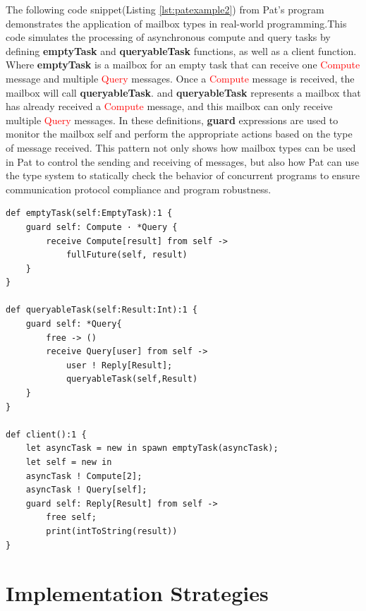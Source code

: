 \documentclass{l4proj}
\begin{document}
The following code snippet(Listing \ref{lst:patexample2}) from Pat's program demonstrates the application of mailbox types in real-world programming.This code simulates the processing of asynchronous compute and query tasks by defining \textbf{emptyTask} and \textbf{queryableTask} functions, as well as a client function. Where \textbf{emptyTask} is a mailbox for an empty task that can receive one \textcolor{red}{Compute} message and multiple \textcolor{red}{Query} messages. Once a \textcolor{red}{Compute} message is received, the mailbox will call \textbf{queryableTask}. and \textbf{queryableTask} represents a mailbox that has already received a \textcolor{red}{Compute} message, and this mailbox can only receive multiple \textcolor{red}{Query} messages. In these definitions, \textbf{guard} expressions are used to monitor the mailbox self and perform the appropriate actions based on the type of message received. This pattern not only shows how mailbox types can be used in Pat to control the sending and receiving of messages, but also how Pat can use the type system to statically check the behavior of concurrent programs to ensure communication protocol compliance and program robustness.

\lstset{style=patstyle}
\begin{lstlisting}[caption={Implementing Concurrent Program for Asynchronous Task Processing and Result Querying}, label={lst:patexample2}]
def emptyTask(self:EmptyTask):1 {
    guard self: Compute · *Query {
        receive Compute[result] from self -> 
            fullFuture(self, result)
    }
}

def queryableTask(self:Result:Int):1 {
    guard self: *Query{
        free -> ()
        receive Query[user] from self ->
            user ! Reply[Result];
            queryableTask(self,Result)
    }
}

def client():1 {
    let asyncTask = new in spawn emptyTask(asyncTask);
    let self = new in 
    asyncTask ! Compute[2];
    asyncTask ! Query[self];
    guard self: Reply[Result] from self ->
        free self;
        print(intToString(result))
}

\end{lstlisting}

\section{Implementation Strategies}
\end{document}
